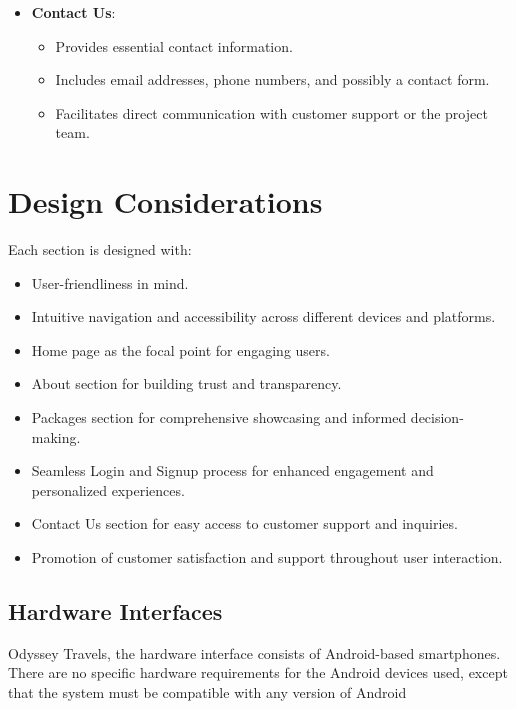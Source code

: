 \documentclass{scrreprt}
\begin{document}
\begin{itemize}
    \item \textbf{Contact Us}:
    \begin{itemize}
        \item Provides essential contact information.
        \item Includes email addresses, phone numbers, and possibly a contact form.
        \item Facilitates direct communication with customer support or the project team.
    \end{itemize}
\end{itemize}

\section*{Design Considerations}
Each section is designed with:
\begin{itemize}
    \item User-friendliness in mind.
    \item Intuitive navigation and accessibility across different devices and platforms.
    \item Home page as the focal point for engaging users.
    \item About section for building trust and transparency.
    \item Packages section for comprehensive showcasing and informed decision-making.
    \item Seamless Login and Signup process for enhanced engagement and personalized experiences.
    \item Contact Us section for easy access to customer support and inquiries.
    \item Promotion of customer satisfaction and support throughout user interaction.
\end{itemize}

\subsection*{Hardware Interfaces}
Odyssey Travels, the hardware interface consists of Android-based smartphones. There are no specific hardware requirements for the Android devices used, except that the system must be compatible with any version of Android
\end{document}
